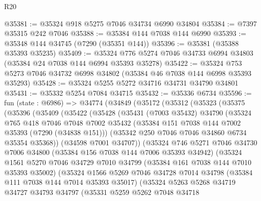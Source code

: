 \begin{lexlean}{R20}
\begin{coremodule}
{@35381 := @35324 @918 @5275 @7046 @34734 @6990 @34804
@35384 := @7397 @35315 @242 @7046
@35388 := @35384 @144 @7038 @144 @6990
@35393 := @35348 @144 @34745 (@7290 (@35351 @144))
@35396 := @35381 (@35388 @35393 @35235)
@35409 := @35324 @776 @5274 @7046 @34733 @6994 @34803 (@35384 @24 @7038 @144 @6994 @35393 @35278)
@35422 := @35324 @753 @5273 @7046 @34732 @6998 @34802 (@35384 @46 @7038 @144 @6998 @35393 @35293)
@35428 := @35324 @5255 @5272 @34716 @34731 @34790 @34801
@35431 := @35332 @5254 @7084 @34715
@35432 := @35336 @6734
@35596 := fun (state : @6986) =>
  @34774
    (@34849
      (@35172
        (@35312
          (@35323
            (@35375
              (@35396
                (@35409
                  (@35422
                    (@35428
                      (@35431
                        (@7003 @35432)
                        @34790
                        (@35324
                          @765
                          @418
                          @7046
                          @7048
                          @7002
                          @35432
                          (@35384 @151 @7038 @144 @7002 @35393 (@7290 (@34838 @151)))
                          (@35342 @250 @7046 @7046 @34860 @6734 @35354 @35368))
                        (@34598 @7001 @34707))
                      (@35324
                        @746
                        @5271
                        @7046
                        @34730
                        @7006
                        @34800
                        (@35384 @156 @7038 @144 @7006 @35393 @34942)
                        (@35324
                          @1561
                          @5270
                          @7046
                          @34729
                          @7010
                          @34799
                          (@35384 @161 @7038 @144 @7010 @35393 @35002)
                          (@35324
                            @1566
                            @5269
                            @7046
                            @34728
                            @7014
                            @34798
                            (@35384 @111 @7038 @144 @7014 @35393 @35017)
                            (@35324
                              @5263
                              @5268
                              @34719
                              @34727
                              @34793
                              @34797
                              (@35331
                                @5259
                                @5262
                                @7048
                                @34718
}
\end{coremodule}
\end{lexlean}
